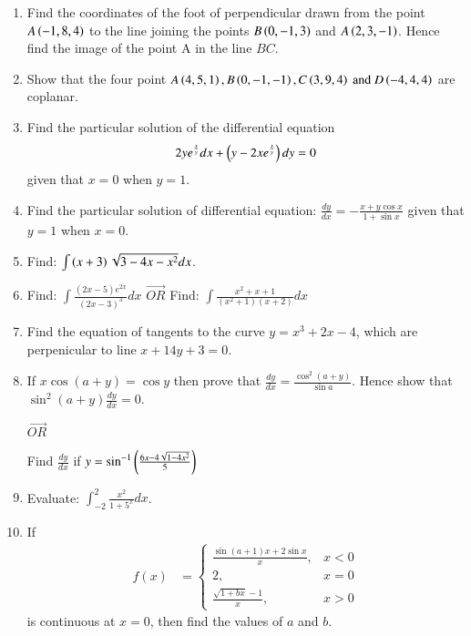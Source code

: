 \documentclass[journal,12pt,twocolumn]{IEEEtran}
\theoremstyle{remark}
\begin{document}
\begin{enumerate}
\item Find the coordinates of the foot of perpendicular drawn from the point $A\left(-1,8,4\right)$ to the line joining the points $B\left(0,-1,3\right)$ and $A\left(2,3,-1\right)$. Hence find the image of the point A in the line $BC$.\\

\item Show that the four point $A\left(4, 5, 1\right), B\left(0,-1,-1\right), C\left(3,9,4\right) \text{ and } D\left(-4,4,4\right)$ are coplanar.\\

\item Find the particular solution of the differential equation
\begin{align}
2ye^{\frac{x}{y}}dx + \left(y - 2xe^{\frac{x}{y}}\right)dy = 0
\end{align}
given that $x=0$ when $y=1$.\\
\item Find the particular solution of differential equation: $\frac{dy}{dx} = -\frac{x+y\cos{x}}{1+\sin{x}}$ given that $y = 1$ when $x=0$.\\

\item Find: $\int{\ensuremath{\left(x+3\right)}\sqrt{3 - 4x - x^2}dx}$.\\

\item Find: $\int{\frac{(2x - 5)e^{2x}}{(2x-3)^3}dx}$ $\vec{OR}$ Find: $\int{\frac{x^2+x+1}{(x^2+1)(x+2)}dx}$\\

\item Find the equation of tangents to the curve $y=x^3+2x-4$, which are perpenicular to line $x+14y+3=0$.\\

\item If $x\cos(a+y) = \cos{y}$ then prove that $\frac{dy}{dx} = \frac{\cos^2(a+y)}{\sin{a}}$. Hence show that $\sin^2(a+y)\frac{dy}{dx} = 0$.
\begin{center} $\vec{OR}$ \\ \end{center}
Find $\frac{dy}{dx}$ if $y = \sin^{-1}\left(\frac{6x - 4\sqrt{1-4x^2}}{5}\right)$\\

\item Evaluate: $\int_{-2}^{2}\frac{x^2}{1+5^x}dx$.\\

\item If \begin{align}f(x) &= \begin{cases}\frac{\sin(a+1)x + 2\sin x}{x}, &x<0\\ 2, &x=0 \\ \frac{\sqrt{1+bx}-1}{x}, &x>0 \end{cases}\end{align} is continuous at $x=0$, then find the values of $a$ and $b$.\\


\end{enumerate}
\end{document}
